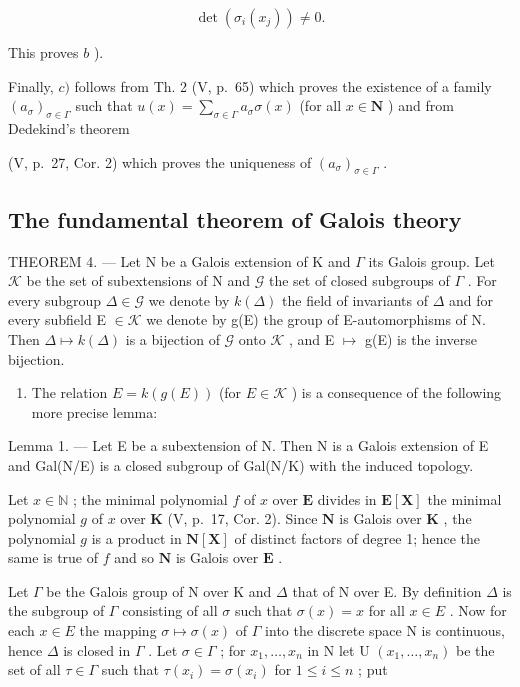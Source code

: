 \[
\det \left(\sigma_ {i} (x _ {j})\right) \neq 0.
\]

This proves \(b\) ).

Finally, \(c)\) follows from Th. 2 (V, p.~65) which proves the existence of a family \((a_{\sigma})_{\sigma \in \Gamma}\) such that \(u(x) = \sum_{\sigma \in \Gamma} a_{\sigma} \sigma(x)\) (for all \(x \in \mathbf{N}\) ) and from Dedekind's theorem

(V, p.~27, Cor. 2) which proves the uniqueness of \((a_{\sigma})_{\sigma \in \Gamma}\) .

\subsection{The fundamental theorem of Galois theory}

THEOREM 4. --- Let N be a Galois extension of K and \(\Gamma\) its Galois group. Let \(\mathcal{K}\) be the set of subextensions of N and \(\mathcal{G}\) the set of closed subgroups of \(\Gamma\) . For every subgroup \(\Delta \in \mathcal{G}\) we denote by \(k(\Delta)\) the field of invariants of \(\Delta\) and for every subfield E \(\in \mathcal{K}\) we denote by g(E) the group of E-automorphisms of N. Then \(\Delta \mapsto k(\Delta)\) is a bijection of \(\mathcal{G}\) onto \(\mathcal{K}\) , and E \(\mapsto\) g(E) is the inverse bijection.

\begin{enumerate}
\def\labelenumi{\Alph{enumi})}
\tightlist
\item
  The relation \(E = k(g(E))\) (for \(E \in \mathcal{K}\) ) is a consequence of the following more precise lemma:
\end{enumerate}

Lemma 1. --- Let E be a subextension of N. Then N is a Galois extension of E and Gal(N/E) is a closed subgroup of Gal(N/K) with the induced topology.

Let \(x \in \mathbb{N}\) ; the minimal polynomial \(f\) of \(x\) over \(\mathbf{E}\) divides in \(\mathbf{E}[\mathbf{X}]\) the minimal polynomial \(g\) of \(x\) over \(\mathbf{K}\) (V, p.~17, Cor. 2). Since \(\mathbf{N}\) is Galois over \(\mathbf{K}\) , the polynomial \(g\) is a product in \(\mathbf{N}[\mathbf{X}]\) of distinct factors of degree 1; hence the same is true of \(f\) and so \(\mathbf{N}\) is Galois over \(\mathbf{E}\) .

Let \(\Gamma\) be the Galois group of N over K and \(\Delta\) that of N over E. By definition \(\Delta\) is the subgroup of \(\Gamma\) consisting of all \(\sigma\) such that \(\sigma(x) = x\) for all \(x \in E\) . Now for each \(x \in E\) the mapping \(\sigma \mapsto \sigma(x)\) of \(\Gamma\) into the discrete space N is continuous, hence \(\Delta\) is closed in \(\Gamma\) . Let \(\sigma \in \Gamma\) ; for \(x_1, \ldots, x_n\) in N let U \((x_1, \ldots, x_n)\) be the set of all \(\tau \in \Gamma\) such that \(\tau(x_i) = \sigma(x_i)\) for \(1 \leqslant i \leqslant n\) ; put

